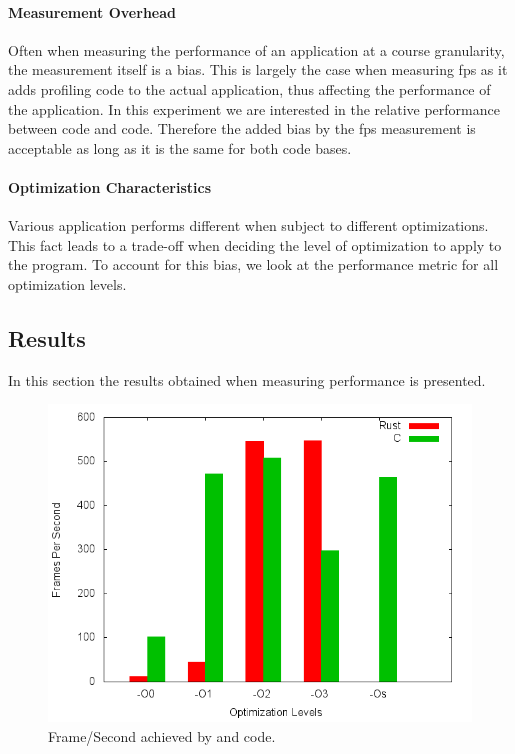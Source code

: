 \paragraph{Measurement Overhead}
Often when measuring the performance of an application at a course granularity, the measurement itself is a bias.
This is largely the case when measuring \gls{fps} as it adds profiling code to the actual application, thus affecting the performance of the application.
In this experiment we are interested in the relative performance between {\C} code and {\rust} code.
Therefore the added bias by the \gls{fps} measurement is acceptable as long as it is the same for both code bases.

\paragraph{Optimization Characteristics}
Various application performs different when subject to different optimizations.
This fact leads to a trade-off when deciding the level of optimization to apply to the program.
To account for this bias, we look at the performance metric for all optimization levels.

\subsection{Results}
\label{sec:perf:res}

In this section the results obtained when measuring performance is presented.

\begin{figure}[H]
  \begin{center}
    \includegraphics[scale=0.5]{results/plots/perf/perf.png}
  \end{center}
  \caption{Frame/Second achieved by {\C} and {\rust} code.}
  \label{fig:perf:res}
\end{figure}

